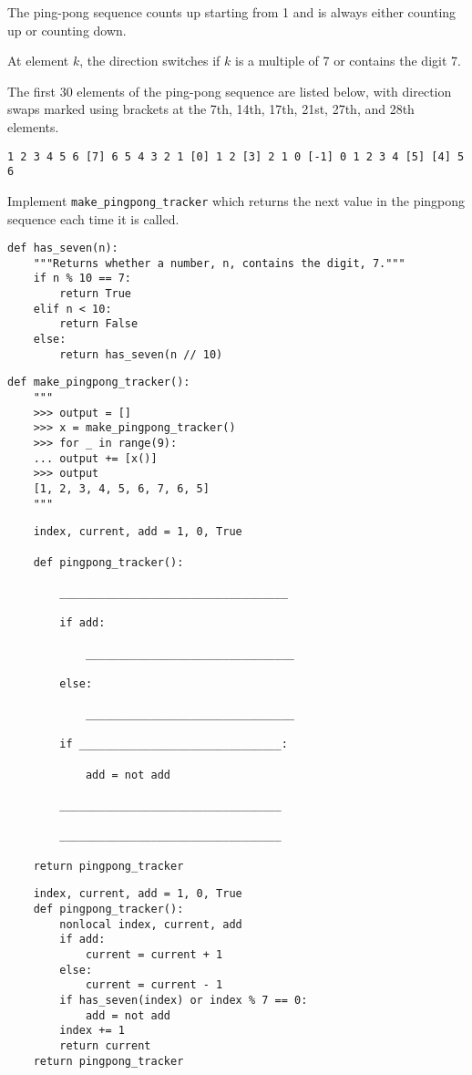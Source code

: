 \begin{blocksection}
\question The ping-pong sequence counts up starting from 1 and is always either counting up or counting down.

At element $k$, the direction switches if $k$ is a multiple of 7 or contains the digit 7.

The first 30 elements of the ping-pong sequence are listed below, with direction swaps marked using brackets at the 7th, 14th, 17th, 21st, 27th, and 28th elements.

\begin{verbatim}
1 2 3 4 5 6 [7] 6 5 4 3 2 1 [0] 1 2 [3] 2 1 0 [-1] 0 1 2 3 4 [5] [4] 5 6
\end{verbatim}

Implement \lstinline$make_pingpong_tracker$ which returns the next value in the pingpong sequence each time it is called.

\begin{lstlisting}
def has_seven(n):
    """Returns whether a number, n, contains the digit, 7."""
    if n % 10 == 7:
        return True
    elif n < 10:
        return False
    else:
        return has_seven(n // 10)
\end{lstlisting}

\begin{lstlisting}
def make_pingpong_tracker():
    """
    >>> output = []
    >>> x = make_pingpong_tracker()
    >>> for _ in range(9):
    ... output += [x()]
    >>> output
    [1, 2, 3, 4, 5, 6, 7, 6, 5]
    """
\end{lstlisting}

\ifprintanswers\else
\begin{lstlisting}
    index, current, add = 1, 0, True

    def pingpong_tracker():

        ___________________________________

        if add:

            ________________________________

        else:

            ________________________________

        if _______________________________:

            add = not add

        __________________________________

        __________________________________

    return pingpong_tracker
\end{lstlisting}
\fi

\begin{solution}
\begin{lstlisting}
    index, current, add = 1, 0, True
    def pingpong_tracker():
        nonlocal index, current, add
        if add:
            current = current + 1
        else:
            current = current - 1
        if has_seven(index) or index % 7 == 0:
            add = not add
        index += 1
        return current
    return pingpong_tracker
\end{lstlisting}
\end{solution}
\end{blocksection}
